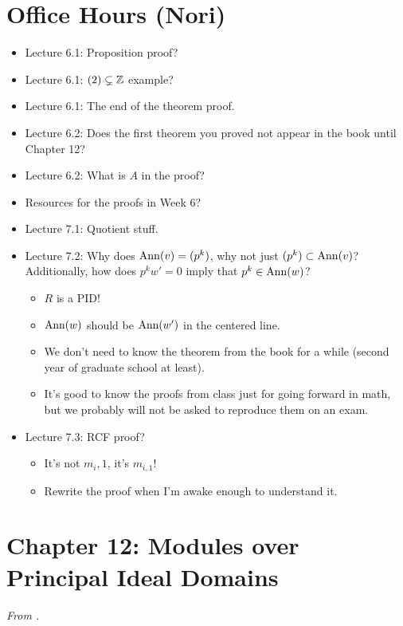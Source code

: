 \documentclass[../notes.tex]{subfiles}
\begin{document}
\section{Office Hours (Nori)}
\begin{itemize}
    \item {}Lecture 6.1: Proposition proof?
    \item Lecture 6.1: $(2)\subsetneq\mathbb{Z}$ example?
    \item Lecture 6.1: The end of the theorem proof.
    \item Lecture 6.2: Does the first theorem you proved not appear in the book until Chapter 12?
    \item Lecture 6.2: What is $A$ in the proof?
    \item Resources for the proofs in Week 6?
    \item Lecture 7.1: Quotient stuff.
    \item Lecture 7.2: Why does $\operatorname{Ann}(v)=(p^k)$, why not just $(p^k)\subset\operatorname{Ann}(v)$? Additionally, how does $p^kw'=0$ imply that $p^k\in\operatorname{Ann}(w)$?
    \begin{itemize}
        \item $R$ is a PID!
        \item $\operatorname{Ann}(w)$ should be $\operatorname{Ann}(w')$ in the centered line.
        \item We don't need to know the theorem from the book for a while (second year of graduate school at least).
        \item It's good to know the proofs from class just for going forward in math, but we probably will not be asked to reproduce them on an exam.
    \end{itemize}
    \item Lecture 7.3: RCF proof?
    \begin{itemize}
        \item It's not $m_i,1$, it's $m_{i,1}$!
        \item Rewrite the proof when I'm awake enough to understand it.
    \end{itemize}
\end{itemize}



\section{Chapter 12: Modules over Principal Ideal Domains}
\emph{From \textcite{bib:DummitFoote}.}
\setcounter{bookch}{12}
\setcounter{proposition}{11}
\end{document}
